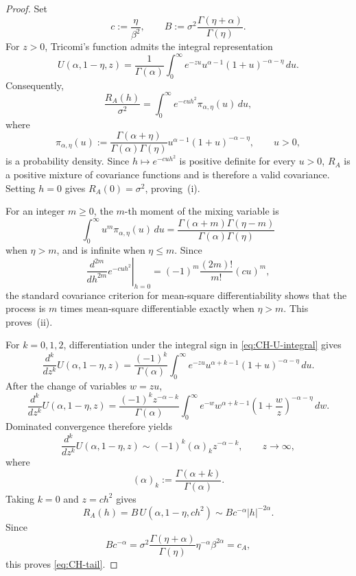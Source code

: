 \documentclass[preprint,12pt,authoryear]{elsarticle}
\begin{document}
\begin{proof}
Set
\[
c:=\frac{\eta}{\beta^2},
\qquad
B:=\sigma^2\frac{\Gamma(\eta+\alpha)}{\Gamma(\eta)}.
\]
For \(z>0\), Tricomi's function admits the integral representation
\begin{equation}\label{eq:CH-U-integral}
U(\alpha,1-\eta,z)
=
\frac{1}{\Gamma(\alpha)}
\int_0^\infty
e^{-zu}u^{\alpha-1}(1+u)^{-\alpha-\eta}
\,du.
\end{equation}
Consequently,
\[
\frac{R_A(h)}{\sigma^2}
=
\int_0^\infty e^{-cuh^2}\pi_{\alpha,\eta}(u)\,du,
\]
where
\[
\pi_{\alpha,\eta}(u)
:=
\frac{\Gamma(\alpha+\eta)}
{\Gamma(\alpha)\Gamma(\eta)}
u^{\alpha-1}(1+u)^{-\alpha-\eta},
\qquad u>0,
\]
is a probability density. Since \(h\mapsto e^{-cuh^2}\) is positive
definite for every \(u>0\), \(R_A\) is a positive mixture of covariance
functions and is therefore a valid covariance. Setting \(h=0\) gives
\(R_A(0)=\sigma^2\), proving~(i).

For an integer \(m\geq0\), the \(m\)-th moment of the mixing variable is
\[
\int_0^\infty u^m\pi_{\alpha,\eta}(u)\,du
=
\frac{\Gamma(\alpha+m)\Gamma(\eta-m)}
{\Gamma(\alpha)\Gamma(\eta)}
\]
when \(\eta>m\), and is infinite when \(\eta\leq m\). Since
\[
\left.
\frac{d^{2m}}{dh^{2m}}e^{-cuh^2}
\right|_{h=0}
=
(-1)^m\frac{(2m)!}{m!}(cu)^m,
\]
the standard covariance criterion for mean-square differentiability
shows that the process is \(m\) times mean-square differentiable
exactly when \(\eta>m\). This proves~(ii).

For \(k=0,1,2\), differentiation under the integral sign in
\eqref{eq:CH-U-integral} gives
\[
\frac{d^k}{dz^k}U(\alpha,1-\eta,z)
=
\frac{(-1)^k}{\Gamma(\alpha)}
\int_0^\infty
e^{-zu}u^{\alpha+k-1}(1+u)^{-\alpha-\eta}
\,du.
\]
After the change of variables \(w=zu\),
\[
\frac{d^k}{dz^k}U(\alpha,1-\eta,z)
=
\frac{(-1)^kz^{-\alpha-k}}{\Gamma(\alpha)}
\int_0^\infty
e^{-w}w^{\alpha+k-1}
\left(1+\frac{w}{z}\right)^{-\alpha-\eta}
\,dw.
\]
Dominated convergence therefore yields
\begin{equation}\label{eq:CH-U-derivatives}
\frac{d^k}{dz^k}U(\alpha,1-\eta,z)
\sim
(-1)^k(\alpha)_kz^{-\alpha-k},
\qquad z\to\infty,
\end{equation}
where
\[
(\alpha)_k
:=
\frac{\Gamma(\alpha+k)}{\Gamma(\alpha)}.
\]
Taking \(k=0\) and \(z=ch^2\) gives
\[
R_A(h)
=
B\,U(\alpha,1-\eta,ch^2)
\sim
Bc^{-\alpha}|h|^{-2\alpha}.
\]
Since
\[
Bc^{-\alpha}
=
\sigma^2
\frac{\Gamma(\eta+\alpha)}{\Gamma(\eta)}
\eta^{-\alpha}\beta^{2\alpha}
=
c_A,
\]
this proves \eqref{eq:CH-tail}.


\end{proof}
\end{document}
